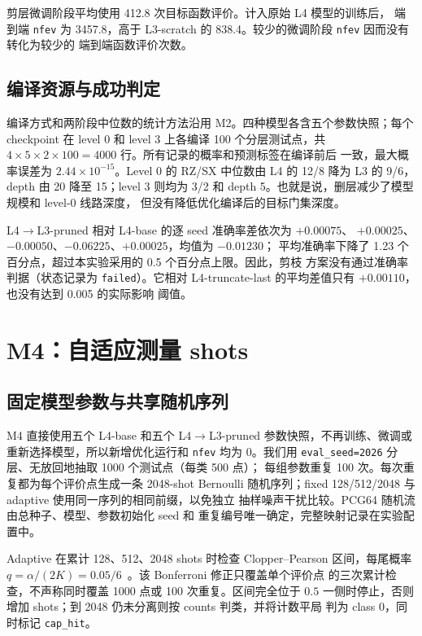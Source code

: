 剪层微调阶段平均使用 412.8 次目标函数评价。计入原始 L4 模型的训练后，
端到端 \texttt{nfev} 为 3457.8，高于
L3-scratch 的 838.4。较少的微调阶段 \texttt{nfev} 因而没有转化为较少的
端到端函数评价次数。

\subsection{编译资源与成功判定}

编译方式和两阶段中位数的统计方法沿用 M2。四种模型各含五个参数快照；每个
checkpoint 在 level 0 和 level 3 上各编译 100 个分层测试点，共
$4\times5\times2\times100=4000$ 行。所有记录的概率和预测标签在编译前后
一致，最大概率误差为 $2.44\times10^{-15}$。Level 0 的
RZ/SX 中位数由 L4 的 12/8 降为 L3 的 9/6，depth 由 20 降至 15；level 3
则均为 3/2 和 depth 5。也就是说，删层减少了模型规模和 level-0 线路深度，
但没有降低优化编译后的目标门集深度。

L4$\to$L3-pruned 相对 L4-base 的逐 seed 准确率差依次为 $+0.00075$、
$+0.00025$、$-0.00050$、$-0.06225$、$+0.00025$，均值为 $-0.01230$；
平均准确率下降了 1.23 个百分点，超过本实验采用的 0.5 个百分点上限。因此，剪枝
方案没有通过准确率判据（状态记录为 \texttt{failed}）。它相对
L4-truncate-last 的平均差值只有 $+0.00110$，也没有达到 0.005 的实际影响
阈值。

\section{M4：自适应测量 shots}
\label{sec:m4-shots}

\subsection{固定模型参数与共享随机序列}

M4 直接使用五个 L4-base 和五个 L4$\to$L3-pruned 参数快照，不再训练、微调或
重新选择模型，所以新增优化运行和 \texttt{nfev} 均为 0。我们用
\texttt{eval\_seed=2026} 分层、无放回地抽取 1000 个测试点（每类 500 点）；
每组参数重复 100 次。每次重复都为每个评价点生成一条 2048-shot Bernoulli
随机序列；fixed 128/512/2048 与 adaptive 使用同一序列的相同前缀，以免独立
抽样噪声干扰比较。PCG64 随机流由总种子、模型、参数初始化 seed 和
重复编号唯一确定，完整映射记录在实验配置中。

Adaptive 在累计 128、512、2048 shots 时检查 Clopper--Pearson 区间，每尾概率
$q=\alpha/(2K)=0.05/6$~\cite{clopper1934}。该 Bonferroni 修正只覆盖单个评价点
的三次累计检查，不声称同时覆盖 1000 点或 100 次重复。区间完全位于 $0.5$
一侧时停止，否则增加 shots；到 2048 仍未分离则按 counts 判类，并将计数平局
判为 class 0，同时标记 \texttt{cap\_hit}。


